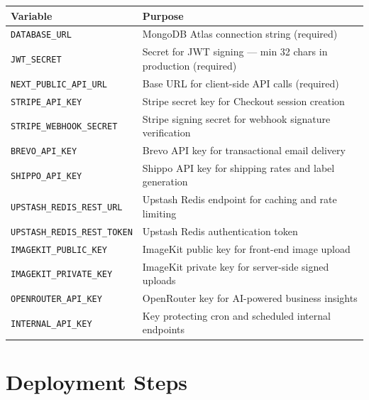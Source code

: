\documentclass[12pt,a4paper]{report}
\begin{document}
\begin{center}
\begin{tabularx}{\textwidth}{lX}
    \toprule
    \textbf{Variable} & \textbf{Purpose} \\
    \midrule
    \texttt{DATABASE\_URL} & MongoDB Atlas connection string (required) \\
    \texttt{JWT\_SECRET} & Secret for JWT signing --- min 32 chars in production (required) \\
    \texttt{NEXT\_PUBLIC\_API\_URL} & Base URL for client-side API calls (required) \\
    \texttt{STRIPE\_API\_KEY} & Stripe secret key for Checkout session creation \\
    \texttt{STRIPE\_WEBHOOK\_SECRET} & Stripe signing secret for webhook signature verification \\
    \texttt{BREVO\_API\_KEY} & Brevo API key for transactional email delivery \\
    \texttt{SHIPPO\_API\_KEY} & Shippo API key for shipping rates and label generation \\
    \texttt{UPSTASH\_REDIS\_REST\_URL} & Upstash Redis endpoint for caching and rate limiting \\
    \texttt{UPSTASH\_REDIS\_REST\_TOKEN} & Upstash Redis authentication token \\
    \texttt{IMAGEKIT\_PUBLIC\_KEY} & ImageKit public key for front-end image upload \\
    \texttt{IMAGEKIT\_PRIVATE\_KEY} & ImageKit private key for server-side signed uploads \\
    \texttt{OPENROUTER\_API\_KEY} & OpenRouter key for AI-powered business insights \\
    \texttt{INTERNAL\_API\_KEY} & Key protecting cron and scheduled internal endpoints \\
    \bottomrule
\end{tabularx}
\end{center}

\section{Deployment Steps}
\end{document}
